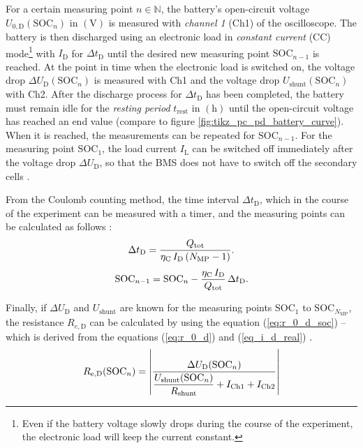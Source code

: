 For a certain measuring point $n \in \mathbb{N}$, the battery's open-circuit voltage $U_{0, \mathrm{D}}(\mathrm{SOC}_n)$ in $\left(\mathrm{V}\right)$ is measured with \emph{channel 1} (Ch1) of the oscilloscope. The battery is then discharged using an electronic load in \emph{constant current} (CC) mode\footnote{Even if the battery voltage slowly drops during the course of the experiment, the electronic load will keep the current constant.} with $I_{\mathrm D}$ for $\Delta t_{\mathrm{D}}$ until the desired new measuring point $\mathrm{SOC}_{n-1}$ is reached. At the point in time when the electronic load is switched on, the voltage drop $\Delta U_{\mathrm D}(\mathrm{SOC}_n)$ is measured with Ch1 and the voltage drop $U_\mathrm{shunt}(\mathrm{SOC}_n)$ with Ch2. After the discharge process for $\Delta t_{\mathrm{D}}$ has been completed, the battery must remain idle for the \emph{resting period} $t_\mathrm{rest}$ in $\left( \mathrm{h} \right)$ until the open-circuit voltage has reached an end value (compare to figure \ref{fig:tikz_pc_pd_battery_curve}). When it is reached, the measurements can be repeated for $\mathrm{SOC}_{n-1}$. For the measuring point $\mathrm{SOC}_1$, the load current $I_\mathrm{L}$ can be switched off immediately after the voltage drop $\Delta U_{\mathrm D}$, so that the BMS does not have to switch off the secondary cells \cite{Rahmoun:2012, Hentunen:2014, Gurjer:2019}.

From the Coulomb counting method, the time interval $\Delta t_{\mathrm{D}}$, which in the course of the experiment can be measured with a timer, and the measuring points can be calculated as follows \cite{He:2011, Wehbe:2015, Nejad:2016, Kurzweil:2018, Li:2018}:
\begin{equation} \label{eq:delta_t_D}
	\centering
	\Delta t_{\mathrm{D}} = \dfrac{ Q_\mathrm{tot}}{\eta_\mathrm{C} \, I_\mathrm{D} \left( N_\mathrm{MP} - 1 \right)} \text{.}
\end{equation}
\begin{equation} \label{eq:SOC_n_minus_1}
	\centering
	\mathrm{SOC}_{n - 1} = \mathrm{SOC}_{n} - \dfrac{\eta_\mathrm{C} \, I_\mathrm{D}}{Q_\mathrm{tot}} \, \Delta t_{\mathrm{D}} \text{.}
\end{equation}

Finally, if $\Delta U_{\mathrm D}$ and $U_\mathrm{shunt}$ are known for the measuring points $\mathrm{SOC}_1$ to $\mathrm{SOC}_{N_{\mathrm{MP}}}$, the resistance $R_{e,\mathrm{D}}$ can be calculated by using the equation (\ref{eq:r_0_d_soc}) -- which is derived from the equations (\ref{eq:r_0_d}) and (\ref{eq_i_d_real}) \cite{Rahmoun:2012, Hentunen:2014, Kurzweil:2018, Gurjer:2019}.
\begin{equation}\label{eq:r_0_d_soc}
	\centering
	R_{\mathrm{e,D}}(\mathrm{SOC}_n) = \left|\dfrac{\Delta U_{\mathrm D}(\mathrm{SOC}_n)}{\dfrac{U_\mathrm{shunt}(\mathrm{SOC}_n)}{R_\mathrm{shunt}} + I_\mathrm{Ch1} + I_\mathrm{Ch2}}\right|
\end{equation}

